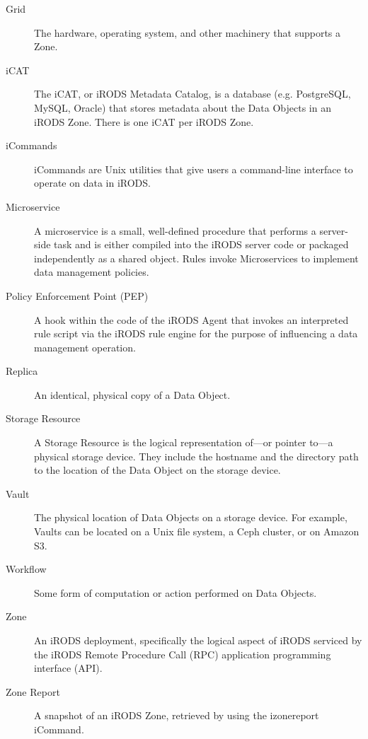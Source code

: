 \documentclass[10pt,oneside]{memoir}
\begin{document}
\begin{description}
\item [Grid]
The hardware, operating system, and other machinery that supports a Zone.

\item [iCAT]
The iCAT, or iRODS Metadata Catalog, is a database (e.g. PostgreSQL, MySQL, Oracle) that stores metadata about the Data Objects in an iRODS Zone. There is one iCAT per iRODS Zone.

\item [iCommands]
iCommands are Unix utilities that give users a command-line interface to operate on data in iRODS.

\item [Microservice]
A microservice is a small, well-defined procedure that performs a server-side task and is either compiled into the iRODS server code or packaged independently as a shared object. Rules invoke Microservices to implement data management policies.

\item [Policy Enforcement Point (PEP)]
A hook within the code of the iRODS Agent that invokes an interpreted rule script via the iRODS rule engine for the purpose of influencing a data management operation.

\item [Replica]
An identical, physical copy of a Data Object.

\item [Storage Resource]
A Storage Resource is the logical representation of---or pointer to---a physical storage device. They include the hostname and the directory path to the location of the Data Object on the storage device.

\item [Vault]
The physical location of Data Objects on a storage device. For example, Vaults can be located on a Unix file system, a Ceph cluster, or on Amazon S3.

\item [Workflow]
Some form of computation or action performed on Data Objects.

\item [Zone]
An iRODS deployment, specifically the logical aspect of iRODS serviced by the iRODS Remote Procedure Call (RPC) application programming interface (API).

\item [Zone Report]
A snapshot of an iRODS Zone, retrieved by using the izonereport iCommand.

\end{description}
\end{document}
